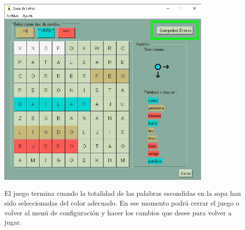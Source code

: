 \includegraphics[width=0.8\textwidth,keepaspectratio]{img/guia/14.jpg}

El juego termina cuando la totalidad de las palabras escondidas en la sopa han sido seleccionadas del color adecuado. En ese momento podrá cerrar el juego o volver al menú de configuración y hacer los cambios que desee para volver a jugar.

	

